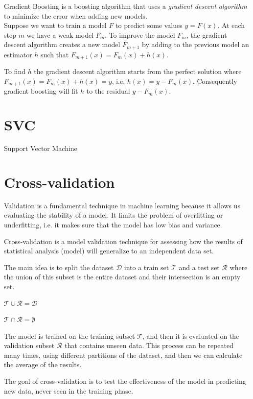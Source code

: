 Gradient Boosting is a boosting algorithm that uses a \textit{gradient descent algorithm} to minimize the error when adding new models.\\

Suppose we want to train a model $F$ to predict some values $y = F(x)$. At each step $m$ we have a weak model $F_m$. To improve the model $F_m$, the gradient descent algorithm creates a new model $F_{m+1}$ by adding to the previous model an estimator $h$ such that $F_{m+1}(x) = F_m(x) + h(x)$. \cite{gradientBoostLi}

To find $h$ the gradient descent algorithm starts from the perfect solution where $F_{m+1}(x) = F_m(x) + h(x) = y$, i.e. $h(x) = y - F_m(x)$. Consequently gradient boosting will fit $h$ to the residual $y - F_m(x)$.
\section{SVC}
Support Vector Machine
\section{Cross-validation}

Validation is a fundamental technique in machine learning because it allows us evaluating the stability of a model. It limits the problem of overfitting or underfitting, i.e. it makes sure that  the model has low bias and variance.

Cross-validation is a model validation technique for assessing how the results of statistical analysis (model) will generalize to an independent data set.

The main idea is to split the dataset $\mathcal{D}$ into a train set $\mathcal{T}$ and a test set $\mathcal{R}$ where the union of this subset is the entire dataset and their intersection is an empty set. \cite{ghojogh2019theory}

 $\mathcal{T} \cup \mathcal{R} = \mathcal{D} $
 
 $\mathcal{T} \cap \mathcal{R} = \emptyset $
 

The model is trained on the training subset $\mathcal{T}$, and then it is evaluated on the validation subset $\mathcal{R}$ that contains unseen data.
This process can be repeated many times, using different partitions of the dataset, and then we can calculate the average of the results.

The goal of cross-validation is to test the effectiveness of the model in predicting new data, never seen in the training phase.\\

